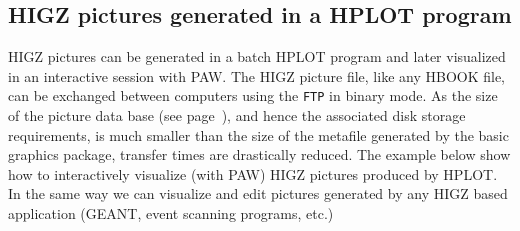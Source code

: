 \subsection{HIGZ pictures generated in a HPLOT program}

HIGZ pictures can be generated in a batch HPLOT program and later visualized 
in an interactive session with PAW. The HIGZ picture file, like any HBOOK file,
can be exchanged between computers using the \texttt{FTP} in binary mode. As the
size of the picture data base (see page~\pageref{sec:H2HIGZP}), and hence the
associated disk storage requirements, is much smaller than the size of the
metafile generated by the basic graphics package, transfer times are
drastically reduced. The example below show how to interactively visualize
(with PAW) HIGZ pictures produced by HPLOT. In the same way we can visualize and
edit pictures generated by any HIGZ based application (GEANT, event scanning
programs, etc.)

\medskip

